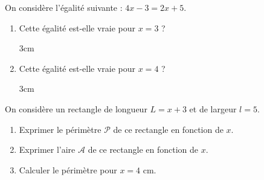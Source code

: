 \documentclass[a4paper]{book}
\begin{document}
    \begin{exercice}
        On considère l'égalité suivante : $4x - 3 = 2x + 5$.
        
        \begin{enumerate}
            \item Cette égalité est-elle vraie pour $x = 3$ ?
            \begin{ZoneReponse}{3cm}\end{ZoneReponse}
            
            \item Cette égalité est-elle vraie pour $x = 4$ ?
            \begin{ZoneReponse}{3cm}\end{ZoneReponse}
        \end{enumerate}
    \end{exercice}
    
    \begin{exercice}
        \begin{minipage}{0.6\linewidth}
            On considère un rectangle de longueur $L = x + 3$ et de largeur $l = 5$.
            \begin{enumerate}
                \item Exprimer le périmètre $\mathcal{P}$ de ce rectangle en fonction de $x$.
                \item Exprimer l'aire $\mathcal{A}$ de ce rectangle en fonction de $x$.
                \item Calculer le périmètre pour $x = 4$ cm.
            \end{enumerate}
        \end{minipage}
        \hfill
        \begin{minipage}{0.35\linewidth}
        \end{minipage}
    \end{exercice}
      
\end{document}
